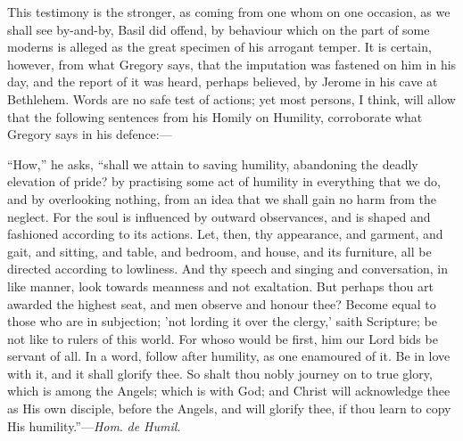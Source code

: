 This testimony is the stronger, as coming from one whom on one
occasion, as we shall see by-and-by, Basil did offend, by behaviour
which on the part of some moderns is alleged as the great specimen of
his arrogant temper. It is certain, however, from what Gregory says,
that the imputation was fastened on him in his day, and the report of
it was heard, perhaps believed, by Jerome in his cave at Bethlehem.
Words are no safe test of actions; yet most persons, I think, will
allow that the following sentences from his Homily on Humility,
corroborate what Gregory says in his defence:—

``How,'' he asks, ``shall we attain to saving humility,
abandoning the deadly elevation of pride? by practising some act of
humility in everything that we do, and by overlooking nothing, from an
idea that we shall gain no harm from the neglect. For the soul is
influenced by outward observances, and is shaped and fashioned
according to its actions. Let, then, thy appearance, and garment, and
gait, and sitting, and table, and bedroom, and house, and its
furniture, all be directed according to lowliness. And thy speech and
singing and conversation, in like manner, look towards meanness and
not exaltation. But perhaps thou art awarded the highest seat, and men
observe and honour thee? Become equal to those who are in subjection;
'not lording it over the clergy,' saith Scripture; be not like to
rulers of this world. For whoso would be first, him our Lord bids be
servant of all. In a word, follow after
humility, as one enamoured of it. Be in love with it, and it shall
glorify thee. So shalt thou nobly journey on to true glory, which is
among the Angels; which is with God; and Christ will acknowledge thee
as His own disciple, before the Angels, and will glorify thee, if thou
learn to copy His humility.''—\emph{Hom}. \emph{de Humil}.

